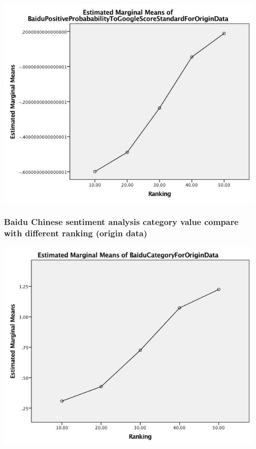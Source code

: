 \begin{center}
\includegraphics[width=.9\linewidth]{./img/MarginalMeansOfBaiduPositiveProbababilityToGoogleScoreStandardForOriginData.jpg}
\end{center}

\subsubsection{Baidu Chinese sentiment analysis category value compare with different ranking (origin data)}
\label{sec:org32005da}
\begin{center}
\includegraphics[width=.9\linewidth]{./img/MarginalMeansOfBaiduCategoryFroOriginData.jpg}
\end{center}

